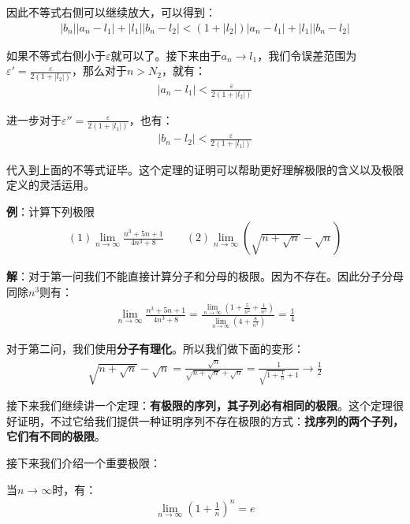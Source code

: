 \documentclass{ctexart}
\let\oldtextbf\textbf %
\renewcommand{\textbf}[1]{\textcolor{btex}{\oldtextbf{#1}}} %
\begin{document}
因此不等式右侧可以继续放大，可以得到：
\begin{align*}
   |b_n||a_n-l_1|+|l_1||b_n-l_2|<(1+|l_2|)|a_n-l_1|+|l_1||b_n-l_2|
\end{align*}

如果不等式右侧小于$\varepsilon$就可以了。接下来由于$a_n\to l_1$，我们令误差范围为$\varepsilon'=\frac{\varepsilon}{2(1+|l_2|)}$，那么对于$n>N_2$，就有：
\begin{align*}
    |a_n-l_1|<\frac{\varepsilon}{2(1+|l_2|)}
\end{align*}

进一步对于$\varepsilon''=\frac{\varepsilon}{2(1+|l_1|)}$，也有：
\begin{align*}
    |b_n-l_2|<\frac{\varepsilon}{2(1+|l_1|)}
\end{align*}

代入到上面的不等式证毕。这个定理的证明可以帮助更好理解极限的含义以及极限定义的灵活运用。

\textbf{\color{btex}例}：计算下列极限
\begin{align*}
(1)\lim_{n\to\infty}\frac{n^3+5n+1}{4n^3+8} \qquad (2) \lim_{n\to\infty} (\sqrt{n+\sqrt{n}}-\sqrt{n} )
\end{align*}

\textbf{\color{btex}解}：对于第一问我们不能直接计算分子和分母的极限。因为不存在。因此分子分母同除$n^3$则有：
\begin{align*}
\lim_{n\to\infty}\frac{n^3+5n+1}{4n^3+8}=\frac{\lim_{n\to\infty}(1+\frac{5}{n^2}+\frac{1}{n^3})}
{\lim_{n\to\infty}(4+\frac{8}{n^3})}=\frac{1}{4} 
\end{align*}

对于第二问，我们使用\textbf{\color{btex}分子有理化}。所以我们做下面的变形：
\begin{align*}
    \sqrt{n+\sqrt{n}}-\sqrt{n}=\frac{\sqrt{n}}{\sqrt{n+\sqrt{n}}+\sqrt{n}}=\frac{1}{\sqrt{1+\frac{1}{n}}+1}\to \frac{1}{2}
\end{align*}

接下来我们继续讲一个定理：\textbf{\color{btex}有极限的序列，其子列必有相同的极限}。这个定理很好证明，不过它给我们提供一种证明序列不存在极限的方式：\textbf{\color{btex}找序列的两个子列，它们有不同的极限}。

接下来我们介绍一个重要极限：
\begin{tcolorbox}[
    colback=bac1,     %
    colframe=fra1,   %
    coltitle=white,             %
    coltext=tex1,
    title=自然对数极限,
    fonttitle=\bfseries,        %
arc=3mm,                     %
breakable
]
当$n\to\infty$时，有：
\begin{align*}
    \lim_{n\to\infty}(1+\frac{1}{n})^n=e\tag{1-8}
\end{align*}
\end{tcolorbox}
\end{document}
